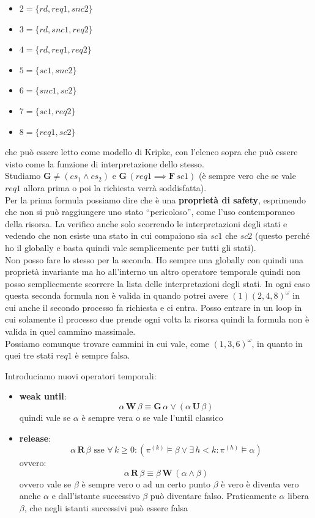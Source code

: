 \documentclass[a4paper,12pt, oneside]{book}
\begin{document}
\begin{esempio}
\begin{itemize}
    \item $2=\{rd,req1,snc2\}$
    \item $3=\{rd,snc1,req2\}$
    \item $4=\{rd,req1,req2\}$
    \item $5=\{sc1, snc2\}$
    \item $6=\{snc1,sc2\}$
    \item $7=\{sc1, req 2\}$
    \item $8=\{req1,sc2\}$
  \end{itemize}
  che può essere letto come modello di Kripke, con l'elenco sopra che può
  essere visto come la funzione di interpretazione dello stesso.\\
  Studiamo $\mathbf{G}\neq (cs_1\land cs_2)$ e $\mathbf{G}\,(req1\implies
  \mathbf{F}\,sc1)$ (è sempre vero che se vale $req1$ allora prima o poi la
  richiesta verrà soddisfatta).\\
  Per la prima formula possiamo dire che è una \textbf{proprietà di safety},
  esprimendo che non si può raggiungere uno stato ``pericoloso'', come l'uso
  contemporaneo della risorsa. La verifico anche solo scorrendo le
  interpretazioni degli stati e vedendo che non esiste una stato in cui
  compaiono sia $sc1$ che $sc2$ (questo perché ho il globally e basta quindi
  vale semplicemente per tutti gli stati). \\
  Non posso fare lo stesso per la seconda. Ho sempre una globally con quindi
  una proprietà invariante ma ho all'interno un altro operatore temporale
  quindi non posso semplicemente scorrere la lista delle interpretazioni degli
  stati. In ogni caso questa seconda formula non è valida in quando potrei
  avere $(1)(2,4,8)^\omega$ in cui anche il secondo processo fa richiesta e ci
  entra. Posso entrare in un loop in cui solamente il processo
  due prende ogni volta la risorsa quindi la formula non è valida in quel
  cammino massimale.\\
  Possiamo comunque trovare cammini in cui vale, come $(1,3,6)^\omega$, in
  quanto in quei tre stati $req1$ è sempre falsa.
\end{esempio}
Introduciamo nuovi operatori temporali:
\begin{itemize}
  \item \textbf{weak until}:
  \[\alpha\,\mathbf{W}\,\beta\equiv \mathbf{G}\,\alpha\lor
    (\alpha\,\mathbf{U}\,\beta)\]
  quindi vale se $\alpha$ è sempre vera o se vale l'until classico
  \item \textbf{release}:
  \[\alpha\,\mathbf{R}\,\beta\mbox{ sse }\forall\,k\geq 0:(\pi^{(k)}\vDash
    \beta\lor \exists\, h<k:\pi^{(h)}\vDash \alpha)\]
  ovvero:
  \[\alpha\,\mathbf{R}\,\beta\equiv \beta\,\mathbf{W}\,(\alpha\land \beta)\]
  ovvero vale se $\beta$ è sempre vero o ad un certo punto $\beta$ è vero è
  diventa vero anche $\alpha$ e dall'istante successivo $\beta$ può diventare
  falso. Praticamente $\alpha$ libera $\beta$, che negli istanti successivi può
  essere falsa
\end{itemize}
\end{document}
